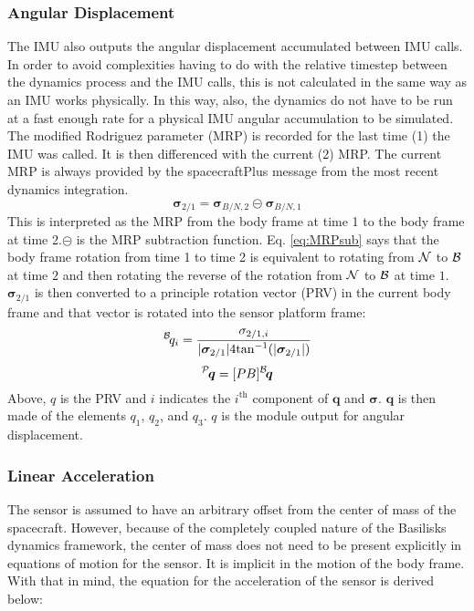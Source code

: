\subsubsection{Angular Displacement}
The IMU also outputs the angular displacement accumulated between IMU calls. In order to avoid complexities having to do with the relative timestep between the dynamics process and the IMU calls, this is not calculated in the same way as an IMU works physically. In this way, also, the dynamics do not have to be run at a fast enough rate for a physical IMU angular accumulation to be simulated. 
The modified Rodriguez parameter (MRP) is recorded for the last time (1) the IMU was called. It is then differenced with the current (2) MRP. The current MRP is always provided by the spacecraftPlus message from the most recent dynamics integration.
\begin{equation}
	\bm{\sigma}_{2/1} = \bm{\sigma}_{B/N,2}  \circleddash  \bm{\sigma}_{B/N,1}
	\label{eq:MRPsub}
\end{equation}
This is interpreted as the MRP from the body frame at time 1 to the body frame at time 2.$\circleddash$ is the MRP subtraction function.  Eq. \ref{eq:MRPsub} says that the body frame rotation from time 1 to time 2 is equivalent to rotating from $\cal{N}$ to $\cal{B}$ at time $2$ and then rotating the reverse of the rotation from $\cal{N}$ to $\cal{B}$ at time $1$. $\bm{\sigma}_{2/1}$ is then converted to a principle rotation vector (PRV) in the current body frame and that vector is rotated into the sensor platform frame:
\begin{equation}
		\leftexp{B} {q_{i}} = \frac{\sigma_{2/1,i}}{|\bm{\sigma}_{2/1}| 4 \mathrm{tan}^{-1}(|\bm{\sigma}_{2/1}|)}
\end{equation}
\begin{equation}
	\leftexp{P}{ \bm{q}} = [PB] \leftexp{B}{ \bm{q}}
\end{equation}
Above, $q$ is the PRV and $i$ indicates the $i^{\mathrm{th}}$ component of $\bm{q}$ and $\bm{\sigma}$. $\bm{q}$ is then made of the elements $q_1$, $q_2$, and $q_3$. $q$ is the module output for angular displacement.

\subsubsection{Linear Acceleration}
The sensor is assumed to have an arbitrary offset from the center of mass of the spacecraft. However, because of the completely coupled nature of the Basilisks dynamics framework, the center of mass does not need to be present explicitly in equations of motion for the sensor. It is implicit in the motion of the body frame. With that in mind, the equation for the acceleration of the sensor is derived below:

